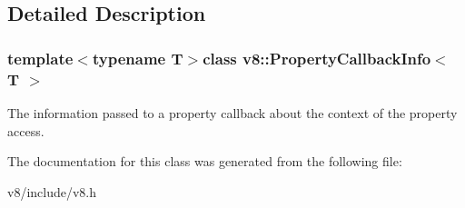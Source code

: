 \subsection{Detailed Description}
\subsubsection*{template$<$typename T$>$class v8\+::\+Property\+Callback\+Info$<$ T $>$}

The information passed to a property callback about the context of the property access. 

The documentation for this class was generated from the following file\+:\begin{DoxyCompactItemize}
\item 
v8/include/v8.\+h\end{DoxyCompactItemize}
